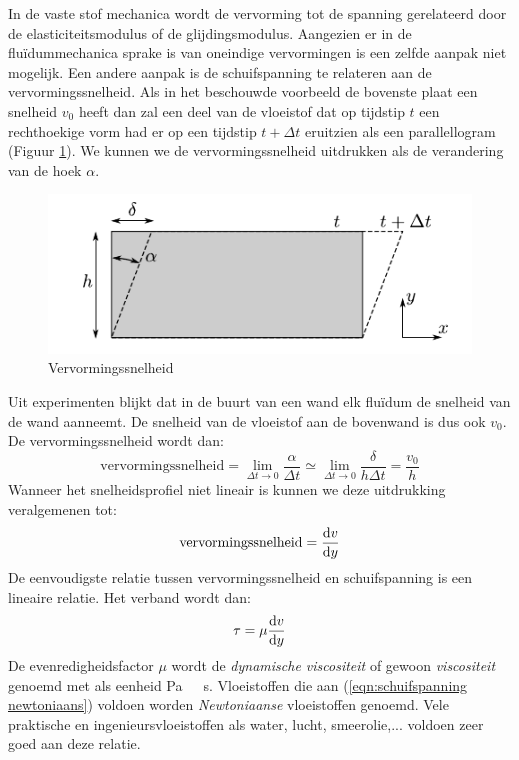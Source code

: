 In de vaste stof mechanica wordt de vervorming tot de spanning gerelateerd door de elasticiteitsmodulus of de glijdingsmodulus. Aangezien er in de fluïdummechanica sprake is van oneindige vervormingen is een zelfde aanpak niet mogelijk. Een andere aanpak is de schuifspanning te relateren aan de vervormingssnelheid. Als in het beschouwde voorbeeld de bovenste plaat een snelheid $v_0$ heeft dan zal een deel van de vloeistof dat op tijdstip $t$ een rechthoekige vorm had er op een tijdstip $t+\Delta t$ eruitzien als een parallellogram (Figuur \ref{fig:Vervormingssnelheid}). We kunnen we de vervormingssnelheid uitdrukken als de verandering van de hoek $\alpha$.
\begin{figure}[htb]
	\centering
	\includegraphics{fig/basisbegrippen/Viscositeit_vervormingssnelheid}
	\caption{Vervormingssnelheid}
	\label{fig:Vervormingssnelheid}
\end{figure}
Uit experimenten blijkt dat in de buurt van een wand elk fluïdum de snelheid van de wand aanneemt. De snelheid van de vloeistof aan de bovenwand is dus ook $v_0$. De vervormingssnelheid wordt dan:
\begin{equation}
	\text{vervormingssnelheid} = \lim_{\Delta t \to 0} \frac{\alpha}{\Delta t} \simeq \lim_{\Delta t \to 0} \frac{\delta}{h \Delta t} = \frac{v_0}{h}
\end{equation}
Wanneer het snelheidsprofiel niet lineair is kunnen we deze uitdrukking veralgemenen tot:
\begin{equation}
	\text{vervormingssnelheid} = \frac{\mathrm{d} v}{\mathrm{d} y}
\end{equation}
De eenvoudigste relatie tussen vervormingssnelheid en schuifspanning is een lineaire relatie. Het verband wordt dan:
\begin{equation}
	\tau = \mu \frac{\mathrm{d} v}{\mathrm{d} y}
	\label{eqn:schuifspanning newtoniaans}
\end{equation}
De evenredigheidsfactor $\mu$ wordt de \emph{dynamische viscositeit} of gewoon \emph{viscositeit} genoemd met als eenheid \unit{Pa\ s}. Vloeistoffen die aan (\ref{eqn:schuifspanning newtoniaans}) voldoen worden \emph{Newtoniaanse} vloeistoffen genoemd. Vele praktische en ingenieursvloeistoffen als water, lucht, smeerolie,... voldoen zeer goed aan deze relatie.

